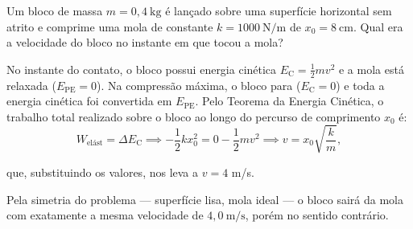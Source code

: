 \begin{exemplo}[Nível II]\label{exemplo_energia_potencialelasticaex02}

Um bloco de massa $m = 0{,}4\ \text{kg}$ é lançado sobre uma superfície
horizontal sem atrito e comprime uma mola de constante $k = 1000\ \text{N/m}$ de
$x_0 = 8\ \text{cm}$. Qual era a velocidade do bloco no instante em que tocou a mola?

\resolucao

No instante do contato, o bloco possui energia cinética
$E_\text{C} = \frac{1}{2}mv^2$ e a mola está relaxada ($E_\text{PE} = 0$). Na compressão máxima,
o bloco para ($E_\text{C} = 0$) e toda a energia cinética foi convertida em $E_\text{PE}$. Pelo
Teorema da Energia Cinética, o trabalho total realizado sobre o bloco ao longo do
percurso de comprimento $x_0$ é:
%
\begin{equation*}
    W_{\text{elást}} = \Delta E_\text{C} \implies
    -\frac{1}{2}kx_0^2 = 0 - \frac{1}{2}mv^2 \implies
    v = x_0\sqrt{\frac{k}{m}},
\end{equation*}

\noindent que, substituindo os valores, nos leva a $v= 4$ m/s.

Pela simetria do problema --- superfície lisa, mola ideal --- o bloco sairá da mola
com exatamente a mesma velocidade de $4{,}0\ \text{m/s}$, porém no sentido contrário.

\end{exemplo}


\vspace{0.3cm}





